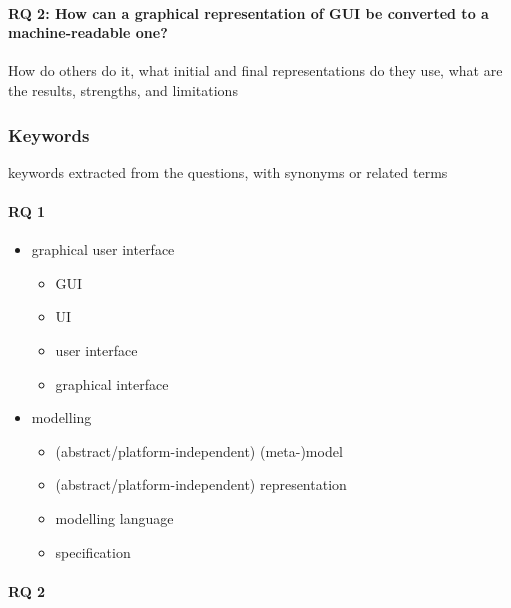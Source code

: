 \paragraph{RQ 2: How can a graphical representation of GUI be converted to a machine-readable one?}
How do others do it, what initial and final representations do they use, what are the results, strengths, and limitations

\subsubsection{Keywords}
keywords extracted from the questions, with synonyms or related terms

\paragraph{RQ 1}

\begin{itemize}
    \item graphical user interface
    \begin{itemize}
        \item GUI
        \item UI
        \item user interface
        \item graphical interface
    \end{itemize}
    \item modelling
    \begin{itemize}
        \item (abstract/platform-independent) (meta-)model
        \item (abstract/platform-independent) representation
        \item modelling language
        \item specification
    \end{itemize}
\end{itemize}

\paragraph{RQ 2}

